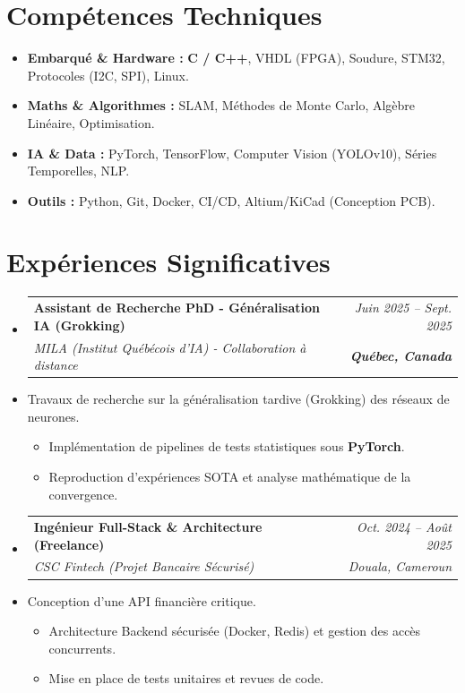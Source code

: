 \documentclass[a4paper,11pt]{article}
\makeatletter
\newcommand{\resumeItem}[1]{\item\small{#1}}
\newcommand{\resumeSubheading}[4]{
  \vspace{-1pt}\item
    \begin{tabular*}{0.97\textwidth}[t]{l@{\extracolsep{\fill}}r}
      \textbf{#1} & \textit{\small #2} \\
      \textit{\small #3} & \textit{\small #4} \\
    \end{tabular*}\vspace{-5pt}
}
\makeatother
\begin{document}
\section{Compétences Techniques}
\begin{itemize}[leftmargin=*, nosep]
    \item \small{\textbf{Embarqué \& Hardware :} \textbf{C / C++}, VHDL (FPGA), Soudure, STM32, Protocoles (I2C, SPI), Linux.}
    \item \small{\textbf{Maths \& Algorithmes :} SLAM, Méthodes de Monte Carlo, Algèbre Linéaire, Optimisation.}
    \item \small{\textbf{IA \& Data :} PyTorch, TensorFlow, Computer Vision (YOLOv10), Séries Temporelles, NLP.}
    \item \small{\textbf{Outils :} Python, Git, Docker, CI/CD, Altium/KiCad (Conception PCB).}
\end{itemize}

\section{Expériences Significatives}
\begin{itemize}[leftmargin=*, label={}]

    \resumeSubheading
      {Assistant de Recherche PhD - Généralisation IA (Grokking)}{Juin 2025 -- Sept. 2025}
      {MILA (Institut Québécois d'IA) - Collaboration à distance}{\textbf{Québec, Canada}}
      \resumeItem{Travaux de recherche sur la généralisation tardive (Grokking) des réseaux de neurones.}
      \begin{itemize}[leftmargin=0.4cm, nosep, label=\tiny$\bullet$]
        \item \small{Implémentation de pipelines de tests statistiques sous \textbf{PyTorch}.}
        \item \small{Reproduction d'expériences SOTA et analyse mathématique de la convergence.}
      \end{itemize}
    \vspace{2pt}

    \resumeSubheading
      {Ingénieur Full-Stack \& Architecture (Freelance)}{Oct. 2024 -- Août 2025}
      {CSC Fintech (Projet Bancaire Sécurisé)}{Douala, Cameroun}
      \resumeItem{Conception d'une API financière critique.}
      \begin{itemize}[leftmargin=0.4cm, nosep, label=\tiny$\bullet$]
        \item \small{Architecture Backend sécurisée (Docker, Redis) et gestion des accès concurrents.}
        \item \small{Mise en place de tests unitaires et revues de code.}
      \end{itemize}
    \vspace{2pt}
\end{itemize}
\end{document}
